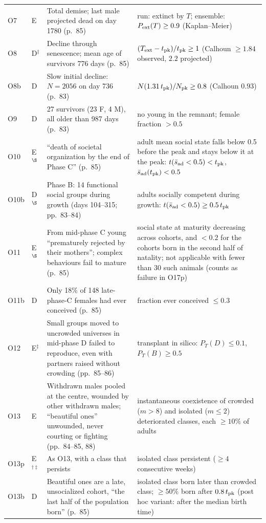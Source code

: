 \documentclass[pre,onecolumn,superscriptaddress,notitlepage]{revtex4-2}
\begin{document}
{\begin{longtable}{@{}p{}p{}p{}p{}@{}}
O7 & E & Total demise; last male projected dead on day 1780 (p.~85) & run: extinct by $T$; ensemble: $P_{\rm ext}(T)\ge 0.9$ (Kaplan--Meier) \\
O8 & D$^\ddagger$ & Decline through senescence; mean age of survivors 776 days (p.~85) & $(T_{\rm ext}-t_{\rm pk})/t_{\rm pk}\ge 1$ (Calhoun $\ge 1.84$ observed, $2.2$ projected) \\
O8b & D & Slow initial decline: $N=2056$ on day 736 (p.~83) & $N(1.31\,t_{\rm pk})/N_{\rm pk}\ge 0.8$ (Calhoun $0.93$) \\
O9 & D & 27 survivors (23 F, 4 M), all older than 987 days (p.~83) & no young in the remnant; female fraction $>0.5$ \\
O10 & E$^\S$ & ``death of societal organization by the end of Phase C'' (p.~85) & adult mean social state falls below 0.5 before the peak and stays below it at the peak: $t(\bar s_{\rm ad}<0.5)<t_{\rm pk}$, $\bar s_{\rm ad}(t_{\rm pk})<0.5$ \\
O10b & D$^\S$ & Phase B: 14 functional social groups during growth (days 104--315; pp.~83--84) & adults socially competent during growth: $t(\bar s_{\rm ad}<0.5)\ge 0.5\,t_{\rm pk}$ \\
O11 & E$^\S$ & From mid-phase C young ``prematurely rejected by their mothers''; complex behaviours fail to mature (p.~85) & social state at maturity decreasing across cohorts, and $<0.2$ for the cohorts born in the second half of natality; not applicable with fewer than 30 such animals (counts as failure in O17p) \\
O11b & D & Only 18\% of 148 late-phase-C females had ever conceived (p.~85) & fraction ever conceived $\le 0.3$ \\
O12 & E$^\ddagger$ & Small groups moved to uncrowded universes in mid-phase D failed to reproduce, even with partners raised without crowding (pp.~85--86) & transplant in silico: $P_T(D)\le 0.1$, $P_T(B)\ge 0.5$ \\
O13 & E & Withdrawn males pooled at the centre, wounded by other withdrawn males; ``beautiful ones'' unwounded, never courting or fighting (pp.~84--85, 88) & instantaneous coexistence of crowded ($m>8$) and isolated ($m\le2$) deteriorated classes, each $\ge 10\%$ of adults \\
O13p & E$^{\dagger\ddagger}$ & As O13, with a class that persists & isolated class persistent ($\ge4$ consecutive weeks) \\
O13b & D & Beautiful ones are a late, unsocialized cohort, ``the last half of the population born'' (p.~85) & isolated class born later than crowded class; $\ge 50\%$ born after $0.8\,t_{\rm pk}$ (post hoc variant: after the median birth time) \\

\end{longtable}}
\end{document}
